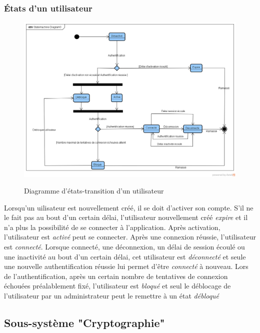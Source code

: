 \subsubsection{États d'un utilisateur}
\begin{figure}[H]
	\centering
	\begin{minipage}{12cm}
		\centering
		{\includegraphics[height=0.35\textheight, width=1\textwidth]{fig/Users-statemachine-diiagram.png}}
	\end{minipage}
	\caption{Diagramme d'états-transition d'un utilisateur}
	\label{fig:7.13}
\end{figure}
Lorsqu'un uilisateur est nouvellement créé, il se doit d'activer son compte. S'il ne le fait pas au bout d'un certain délai, l'utilisateur nouvellement créé \textit{expire} et il n'a plus la possibilité de se connecter à l'application. Après activation, l'utilisateur est \textit{activé} peut se connecter. Après une connexion réussie, l'utilisateur est \textit{connecté}. Lorsque connecté, une déconnexion, un délai de session écoulé ou une inactivité au bout d'un certain délai, cet utilisateur est \textit{déconnecté} et seule une nouvelle authentification réussie lui permet d'être \textit{connecté} à nouveau. Lors de l'authentification, après un certain nombre de tentatives de connexion échouées préalablement fixé, l'utilisateur est \textit{bloqué} et seul le déblocage de l'utilisateur par un administrateur peut le remettre à un état \textit{débloqué}

\subsection{Sous-système "Cryptographie"}
